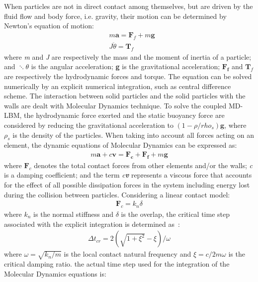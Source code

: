 When particles are not in direct contact among themselves, but are driven by the fluid flow and body force, i.e. gravity, their motion can be determined by Newton's equation of motion:
\begin{align}
& \mathit{m}\mathbf{ a}=\mathbf{F}_{f} + \mathit{m }\mathbf{g} \\
& \mathit{J } \ddot{\theta} =  \mathbf{T}_{f}
\end{align}
where \textit{m} and \textit{J} are respectively the mass and the moment of inertia of a particle; and $\ddots{\theta}$ is the angular acceleration; \textbf{g} is the gravitational acceleration; $\mathbf{F_f}$ and $\mathbf{T}_{f}$ are respectively the hydrodynamic forces and torque. The equation can be solved numerically by an explicit numerical integration, such as central difference scheme. The interaction between solid particles and the solid particles with the walls are dealt with Molecular Dynamics technique. To solve the coupled MD-LBM, the hydrodynamic force exerted and the static buoyancy force are considered by reducing the gravitational acceleration to $(1- \rho/rho_{s})\mathbf{g}$, where $\rho_{s}$ is the density of the particles. When taking into account all forces acting on an element, the dynamic equations of Molecular Dynamics can be expressed as:
\begin{align}
\mathit{m}\mathbf{a} +\mathit{c}\mathbf{v} = \mathbf{F_c} + \mathbf{F_f} +\mathit{m}\mathbf{g}
\label{eq:mde}
\end{align} 
where $\mathbf{F}_{c}$ denotes the total contact forces from other elements and/or the walls; \textit{c} is a damping coefficient; and the term \textit{c\textbf{v}} represents a viscous force that accounts for the effect of all possible dissipation forces in the system including energy lost during the collision between particles. Considering a linear contact model:
\begin{align}
\mathbf{F}_{c}=\mathit{k}_{\mathit{n}} \delta
\end{align}
where $\mathit{k}_{\mathit{n}}$ is the normal stiffness and $\delta$ is the overlap, the critical time step associated with the explicit integration is determined as~\citep{He1997}:
\begin{align}
\Delta t_{\mathit{cr}}= 2(\sqrt{1 + \xi^{2}}-\xi) / \omega
\end{align}
where $\omega = \sqrt{\mathit{k}_{\mathit{n}}/\mathit{m}}$ is the local contact natural frequency and $\xi = \mathit{c}/2\mathit{m}\omega$ is the critical damping ratio. the actual time step used for the integration of the Molecular Dynamics equations is:
